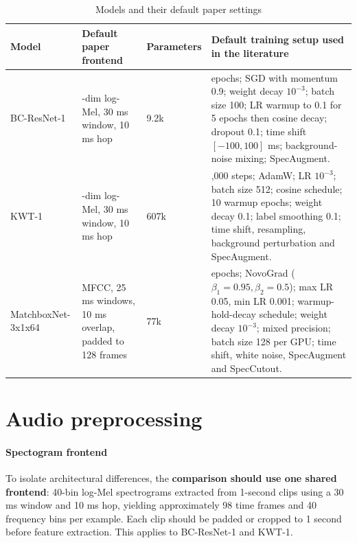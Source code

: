 \documentclass[11pt]{article}
\begin{document}
\begin{table}[H]
\centering
\small
\begin{tabularx}{\textwidth}{>{\raggedright\arraybackslash}p{2.5cm} >{\raggedright\arraybackslash}p{2.4cm} >{\raggedright\arraybackslash}p{1.8cm} >{\raggedright\arraybackslash}X}
\toprule
Model & Default paper frontend & Parameters & Default training setup used in the literature \\
\midrule
BC-ResNet-1 \cite{bcresnet} &
40-dim log-Mel, 30 ms window, 10 ms hop &
9.2k &
200 epochs; SGD with momentum 0.9; weight decay \(10^{-3}\); batch size 100; LR warmup to 0.1 for 5 epochs then cosine decay; dropout 0.1; time shift \([-100,100]\) ms; background-noise mixing; SpecAugment. \\
\addlinespace
KWT-1 \cite{kwt,kwtrepo} &
40-dim log-Mel, 30 ms window, 10 ms hop &
607k &
23,000 steps; AdamW; LR \(10^{-3}\); batch size 512; cosine schedule; 10 warmup epochs; weight decay 0.1; label smoothing 0.1; time shift, resampling, background perturbation and SpecAugment. \\
\addlinespace
MatchboxNet-3x1x64 \cite{matchbox} &
64 MFCC, 25 ms windows, 10 ms overlap, padded to 128 frames &
77k &
200 epochs; NovoGrad (\(\beta_1=0.95, \beta_2=0.5\)); max LR 0.05, min LR 0.001; warmup-hold-decay schedule; weight decay \(10^{-3}\); mixed precision; batch size 128 per GPU; time shift, white noise, SpecAugment and SpecCutout. \\
\bottomrule
\end{tabularx}
\caption{Models and their default paper settings}
\label{tab:models}
\end{table}



\section{Audio preprocessing}

\paragraph{Spectogram frontend}

To isolate architectural differences, the \textbf{comparison should use one shared frontend}: 40-bin log-Mel spectrograms extracted from 1-second clips using a 30 ms window and 10 ms hop, yielding approximately 98 time frames and 40 frequency bins per example. Each clip should be padded or cropped to 1 second before feature extraction. This applies to BC-ResNet-1 and KWT-1.
\end{document}
